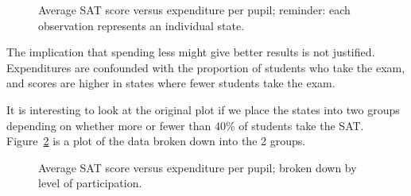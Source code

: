 \documentclass[
  letterpaper,
  DIV=11,
  numbers=noendperiod]{scrreprt}
\begin{document}
\begin{figure}


\caption{\label{fig-confound2}Average SAT score versus expenditure per
pupil; reminder: each observation represents an individual state.}

\end{figure}%

The implication that spending less might give better results is not
justified. Expenditures are confounded with the proportion of students
who take the exam, and scores are higher in states where fewer students
take the exam.

It is interesting to look at the original plot if we place the states
into two groups depending on whether more or fewer than 40\% of students
take the SAT. Figure~\ref{fig-conditional} is a plot of the data broken
down into the 2 groups.

\begin{figure}


\caption{\label{fig-conditional}Average SAT score versus expenditure per
pupil; broken down by level of participation.}

\end{figure}%
\end{document}
